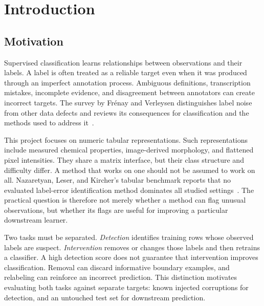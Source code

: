 \chapter{Introduction}
\section{Motivation}
Supervised classification learns relationships between observations and their
labels. A label is often treated as a reliable target even when it was produced
through an imperfect annotation process. Ambiguous definitions, transcription
mistakes, incomplete evidence, and disagreement between annotators can create
incorrect targets. The survey by Fr\'{e}nay and Verleysen distinguishes label
noise from other data defects and reviews its consequences for classification
and the methods used to address it~\cite{frenay2014}.

This project focuses on numeric tabular representations. Such representations
include measured chemical properties, image-derived morphology, and flattened
pixel intensities. They share a matrix interface, but their class structure
and difficulty differ. A method that works on one should not be assumed to
work on all. Nazaretyan, Leser, and Kircher's tabular benchmark reports that
no evaluated label-error identification method dominates all studied
settings~\cite{nazaretyan2025}. The practical question is therefore not merely
whether a method can flag unusual observations, but whether its flags are
useful for improving a particular downstream learner.

Two tasks must be separated. \emph{Detection} identifies training rows whose
observed labels are suspect. \emph{Intervention} removes or changes those
labels and then retrains a classifier. A high detection score does not
guarantee that intervention improves classification. Removal can discard
informative boundary examples, and relabeling can reinforce an incorrect
prediction. This distinction motivates evaluating both tasks against separate
targets: known injected corruptions for detection, and an untouched test set
for downstream prediction.

